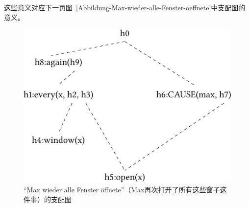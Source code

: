\noindent
这些意义对应下一页图~\vref{Abbildung-Max-wieder-alle-Fenster-oeffnete}中支配图的意义。
\begin{figure}
\centering

\includegraphics{Figures/mrs-max-wieder-alle-fenster-oeffnete-cropped.pdf}
\caption{“Max wieder alle Fenster öffnete”（Max再次打开了所有这些窗子这件事）\label{Abbildung-Max-wieder-alle-Fenster-oeffnete}的支配图}
\end{figure}%
